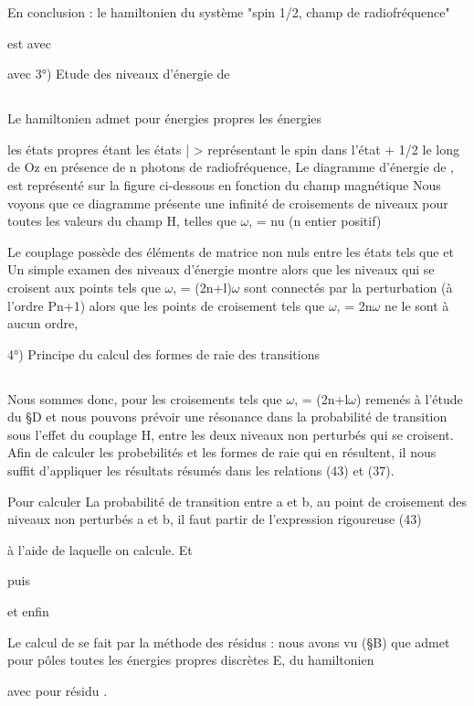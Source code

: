 En conclusion : le hamiltonien du système "spin 1/2, champ de radiofréquence"

est
avec

avec
3°) Etude des niveaux d'énergie de
\subsection{}%
Le hamiltonien  admet pour énergies propres les énergies

les états propres étant les états |  > représentant le spin dans l'état
+ 1/2 le long de Oz en présence de n photons de radiofréquence,
Le diagramme d'énergie de , est représenté sur la figure ci-dessous en
fonction du champ magnétique 
Nous voyons que ce diagramme présente une infinité de croisements de
niveaux pour toutes les valeurs du champ H, telles que $\omega$, = nu (n entier positif)

Le couplage  possède des éléments de matrice non nuls
entre les états tels que  et Un simple examen des niveaux
d'énergie montre alors que les niveaux qui se croisent aux points tels que
$\omega$, = (2n+l)$\omega$ sont connectés par la perturbation (à l'ordre Pn+1) alors que
les points de croisement tels que $\omega$, = 2n$\omega$ ne le sont à aucun ordre,

4°) Principe du calcul des formes de raie des transitions
\subsection{}%
Nous sommes donc, pour les croisements tels que $\omega$, = (2n+l$\omega$)
remenés à l'étude du \S D et nous pouvons prévoir une résonance dans la probabilité
de transition sous l'effet du couplage H, entre les deux niveaux non
perturbés qui se croisent. Afin de calculer les probebilités et les formes de
raie qui en résultent, il nous suffit d'appliquer les résultats résumés dans
les relations (43) et (37).

Pour calculer La probabilité de transition entre a et b, au point de croisement
des niveaux non perturbés a et b, il faut partir de l'expression rigoureuse (43)

à l'aide de laquelle on calcule. Et

puis

et enfin

Le calcul de  se fait par la méthode des résidus : nous avons vu (\S B) que
 admet pour pôles toutes les énergies propres discrètes E, du hamiltonien

 avec pour résidu .

